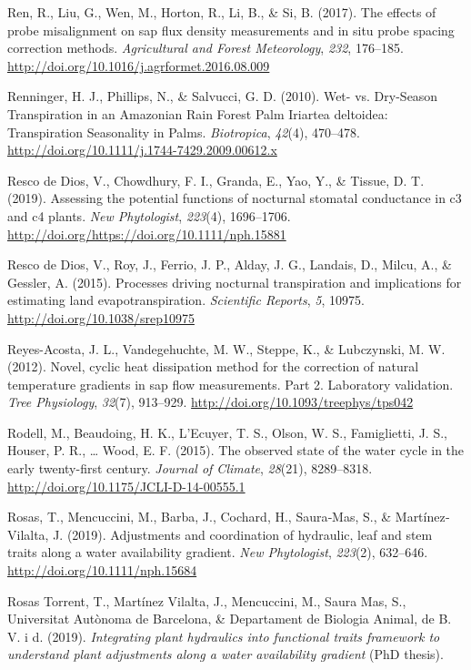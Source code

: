 \documentclass[11pt,twoside]{reedthesis}
\begin{document}
\hypertarget{ref-Ren2017}{}
Ren, R., Liu, G., Wen, M., Horton, R., Li, B., \& Si, B. (2017). The
effects of probe misalignment on sap flux density measurements and in
situ probe spacing correction methods. \emph{Agricultural and Forest
Meteorology}, \emph{232}, 176--185.
\url{http://doi.org/10.1016/j.agrformet.2016.08.009}

\hypertarget{ref-renninger2010}{}
Renninger, H. J., Phillips, N., \& Salvucci, G. D. (2010). Wet- vs.
Dry-Season Transpiration in an Amazonian Rain Forest Palm Iriartea
deltoidea: Transpiration Seasonality in Palms. \emph{Biotropica},
\emph{42}(4), 470--478.
\url{http://doi.org/10.1111/j.1744-7429.2009.00612.x}

\hypertarget{ref-RescodeDios2019}{}
Resco de Dios, V., Chowdhury, F. I., Granda, E., Yao, Y., \& Tissue, D.
T. (2019). Assessing the potential functions of nocturnal stomatal
conductance in c3 and c4 plants. \emph{New Phytologist}, \emph{223}(4),
1696--1706. \url{http://doi.org/https://doi.org/10.1111/nph.15881}

\hypertarget{ref-rescodedios2015}{}
Resco de Dios, V., Roy, J., Ferrio, J. P., Alday, J. G., Landais, D.,
Milcu, A., \& Gessler, A. (2015). Processes driving nocturnal
transpiration and implications for estimating land evapotranspiration.
\emph{Scientific Reports}, \emph{5}, 10975.
\url{http://doi.org/10.1038/srep10975}

\hypertarget{ref-Reyes-Acosta2012}{}
Reyes-Acosta, J. L., Vandegehuchte, M. W., Steppe, K., \& Lubczynski, M.
W. (2012). Novel, cyclic heat dissipation method for the correction of
natural temperature gradients in sap flow measurements. Part 2.
Laboratory validation. \emph{Tree Physiology}, \emph{32}(7), 913--929.
\url{http://doi.org/10.1093/treephys/tps042}

\hypertarget{ref-Rodell2015}{}
Rodell, M., Beaudoing, H. K., L'Ecuyer, T. S., Olson, W. S.,
Famiglietti, J. S., Houser, P. R., \ldots{} Wood, E. F. (2015). The
observed state of the water cycle in the early twenty-first century.
\emph{Journal of Climate}, \emph{28}(21), 8289--8318.
\url{http://doi.org/10.1175/JCLI-D-14-00555.1}

\hypertarget{ref-rosas_adjustments_2019}{}
Rosas, T., Mencuccini, M., Barba, J., Cochard, H., Saura‐Mas, S., \&
Martínez‐Vilalta, J. (2019). Adjustments and coordination of hydraulic,
leaf and stem traits along a water availability gradient. \emph{New
Phytologist}, \emph{223}(2), 632--646.
\url{http://doi.org/10.1111/nph.15684}

\hypertarget{ref-rosas_torrent_integrating_2019}{}
Rosas Torrent, T., Martínez Vilalta, J., Mencuccini, M., Saura Mas, S.,
Universitat Autònoma de Barcelona, \& Departament de Biologia Animal, de
B. V. i d. (2019). \emph{Integrating plant hydraulics into functional
traits framework to understand plant adjustments along a water
availability gradient} (PhD thesis).
\end{document}
